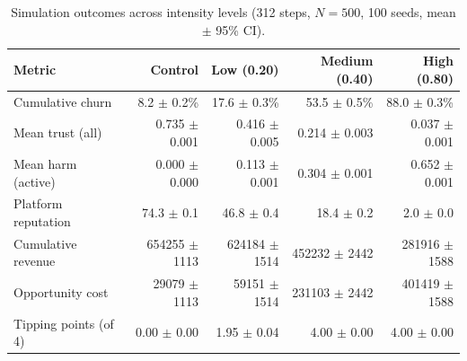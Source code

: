 \begin{table}[!t]
\centering
\caption{Simulation outcomes across intensity levels (312 steps, $N=500$, 100 seeds, mean $\pm$ 95\% CI).}
\label{tab:intensity}
\begin{tabular}{lrrrr}
\toprule
Metric & Control & Low (0.20) & Medium (0.40) & High (0.80) \\
\midrule
Cumulative churn & 8.2 $\pm$ 0.2\% & 17.6 $\pm$ 0.3\% & 53.5 $\pm$ 0.5\% & 88.0 $\pm$ 0.3\% \\
Mean trust (all) & 0.735 $\pm$ 0.001 & 0.416 $\pm$ 0.005 & 0.214 $\pm$ 0.003 & 0.037 $\pm$ 0.001 \\
Mean harm (active) & 0.000 $\pm$ 0.000 & 0.113 $\pm$ 0.001 & 0.304 $\pm$ 0.001 & 0.652 $\pm$ 0.001 \\
Platform reputation & 74.3 $\pm$ 0.1 & 46.8 $\pm$ 0.4 & 18.4 $\pm$ 0.2 & 2.0 $\pm$ 0.0 \\
Cumulative revenue & 654255 $\pm$ 1113 & 624184 $\pm$ 1514 & 452232 $\pm$ 2442 & 281916 $\pm$ 1588 \\
Opportunity cost & 29079 $\pm$ 1113 & 59151 $\pm$ 1514 & 231103 $\pm$ 2442 & 401419 $\pm$ 1588 \\
Tipping points (of 4) & 0.00 $\pm$ 0.00 & 1.95 $\pm$ 0.04 & 4.00 $\pm$ 0.00 & 4.00 $\pm$ 0.00 \\
\bottomrule
\end{tabular}
\end{table}
